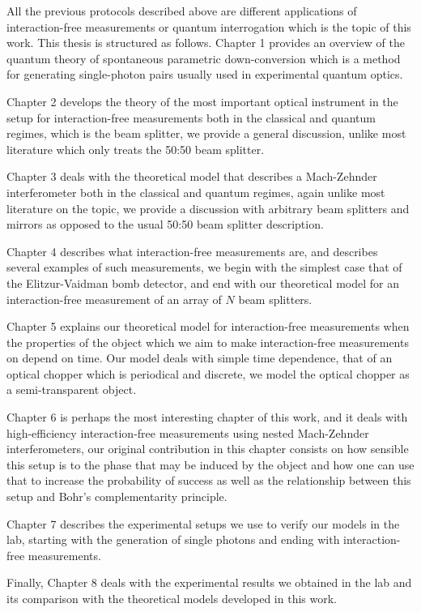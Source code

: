 \documentclass[12pt]{book}
\begin{document}
\thispagestyle{plain}
All the previous protocols described above are different applications of interaction-free measurements or quantum interrogation which is the topic of this work. This thesis is structured as follows. Chapter 1 provides an overview of the quantum theory of spontaneous parametric down-conversion which is a method for generating single-photon pairs usually used in experimental quantum optics.

Chapter 2 develops the theory of the most important optical instrument in the setup for interaction-free measurements both in the classical and quantum regimes, which is the beam splitter, we provide a general discussion, unlike most literature which only treats the 50:50 beam splitter. 

Chapter 3 deals with the theoretical model that describes a Mach-Zehnder interferometer both in the classical and quantum regimes, again unlike most literature on the topic, we provide a discussion with arbitrary beam splitters and mirrors as opposed to the usual 50:50 beam splitter description.

Chapter 4 describes what interaction-free measurements are, and describes several examples of such measurements, we begin with the simplest case that of the Elitzur-Vaidman bomb detector, and end with our theoretical model for an interaction-free measurement of an array of $N$ beam splitters.

Chapter 5 explains our theoretical model for interaction-free measurements when the properties of the object which we aim to make interaction-free measurements on depend on time. Our model deals with simple time dependence, that of an optical chopper which is periodical and discrete, we model the optical chopper as a semi-transparent object.

Chapter 6 is perhaps the most interesting chapter of this work, and it deals with high-efficiency interaction-free measurements using nested Mach-Zehnder interferometers, our original contribution in this chapter consists on how sensible this setup is to the phase that may be induced by the object and how one can use that to increase the probability of success as well as the relationship between this setup and Bohr's complementarity principle.

Chapter 7 describes the experimental setups we use to verify our models in the lab, starting with the generation of single photons and ending with interaction-free measurements.

Finally, Chapter 8 deals with the experimental results we obtained in the lab and its comparison with the theoretical models developed in this work.
\end{document}
